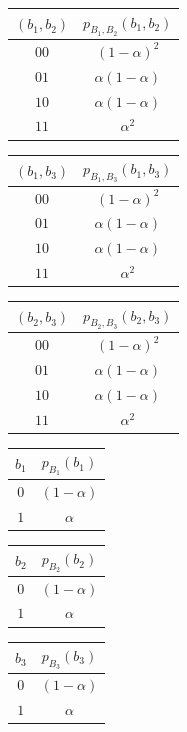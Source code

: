 \begin{table}[h]
    \centering
    \begin{tabular}{|c|c|}
        \hline
        $(b_1, b_2)$ & $p_{B_1, B_2}(b_1, b_2)$ \\
        \hline
        $00$ & $(1-\alpha)^2$ \\
        $01$ & $\alpha(1-\alpha)$ \\
        $10$ & $\alpha(1-\alpha)$ \\
        $11$ & $\alpha^2$ \\
        \hline
    \end{tabular}
    \quad
    \begin{tabular}{|c|c|}
        \hline
        $(b_1, b_3)$ & $p_{B_1, B_3}(b_1, b_3)$ \\
        \hline
        $00$ & $(1-\alpha)^2$ \\
        $01$ & $\alpha(1-\alpha)$ \\
        $10$ & $\alpha(1-\alpha)$ \\
        $11$ & $\alpha^2$ \\
        \hline
    \end{tabular}
    \quad
    \begin{tabular}{|c|c|}
        \hline
        $(b_2, b_3)$ & $p_{B_2, B_3}(b_2, b_3)$ \\
        \hline
        $00$ & $(1-\alpha)^2$ \\
        $01$ & $\alpha(1-\alpha)$ \\
        $10$ & $\alpha(1-\alpha)$ \\
        $11$ & $\alpha^2$ \\
        \hline
    \end{tabular}
\end{table}



\begin{table}[h]
    \centering
    \begin{tabular}{|c|c|}
        \hline
        $b_1$ & $p_{B_1}(b_1)$ \\
        \hline
        $0$ & $(1-\alpha)$ \\
        $1$ & $\alpha$ \\
        \hline
    \end{tabular}
    \quad\quad
    \begin{tabular}{|c|c|}
        \hline
        $b_2$ & $p_{B_2}(b_2)$ \\
        \hline
        $0$ & $(1-\alpha)$ \\
        $1$ & $\alpha$ \\
        \hline
    \end{tabular}
    \quad\quad
    \begin{tabular}{|c|c|}
        \hline
        $b_3$ & $p_{B_3}(b_3)$ \\
        \hline
        $0$ & $(1-\alpha)$ \\
        $1$ & $\alpha$ \\
        \hline
    \end{tabular}
\end{table}


